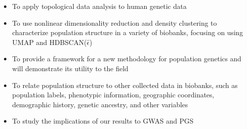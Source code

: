 \begin{itemize}
\item To apply topological data analysis to human genetic data
\item To use nonlinear dimensionality reduction and density clustering to characterize population structure in a variety of biobanks, focusing on using UMAP and HDBSCAN($\hat{\epsilon}$)
\item To provide a framework for a new methodology for population genetics and will demonstrate its utility to the field
\item To relate population structure to other collected data in biobanks, such as population labels, phenotypic information, geographic coordinates, demographic history, genetic ancestry, and other variables
\item To study the implications of our results to GWAS and PGS
\end{itemize}